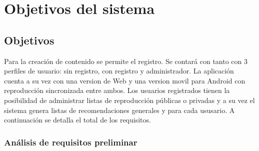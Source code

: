 
\chapter{Objetivos del sistema} %

\label{Chapter2} %


\section{Objetivos}

Para la creación de contenido se permite el registro. Se contará con tanto con 3 perfiles de usuario: sin registro, con registro y administrador.
La aplicación cuenta a su vez con una version de Web y una version movil para Android con reproducción sincronizada entre ambos.
Los usuarios registrados tienen la posibilidad de administrar listas de reproducción públicas o privadas y a su vez el sistema genera listas de recomendaciones generales y para cada ususario.
A continuación se detalla el total de los requisitos.

\subsection{An\'alisis de requisitos preliminar}

